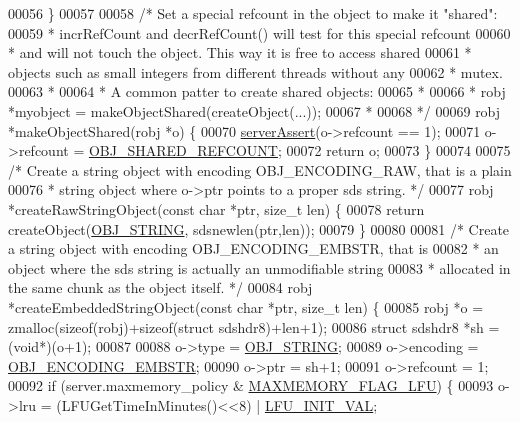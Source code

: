 \begin{DoxyCode}
00056 \}
00057 
00058 \textcolor{comment}{/* Set a special refcount in the object to make it "shared":}
00059 \textcolor{comment}{ * incrRefCount and decrRefCount() will test for this special refcount}
00060 \textcolor{comment}{ * and will not touch the object. This way it is free to access shared}
00061 \textcolor{comment}{ * objects such as small integers from different threads without any}
00062 \textcolor{comment}{ * mutex.}
00063 \textcolor{comment}{ *}
00064 \textcolor{comment}{ * A common patter to create shared objects:}
00065 \textcolor{comment}{ *}
00066 \textcolor{comment}{ * robj *myobject = makeObjectShared(createObject(...));}
00067 \textcolor{comment}{ *}
00068 \textcolor{comment}{ */}
00069 robj *makeObjectShared(robj *o) \{
00070     \hyperlink{server_8h_a88114b5169b4c382df6b56506285e56a}{serverAssert}(o->refcount == 1);
00071     o->refcount = \hyperlink{server_8h_a1dc2a137875b0c8ee0fa1df43684a7b8}{OBJ\_SHARED\_REFCOUNT};
00072     \textcolor{keywordflow}{return} o;
00073 \}
00074 
00075 \textcolor{comment}{/* Create a string object with encoding OBJ\_ENCODING\_RAW, that is a plain}
00076 \textcolor{comment}{ * string object where o->ptr points to a proper sds string. */}
00077 robj *createRawStringObject(\textcolor{keyword}{const} \textcolor{keywordtype}{char} *ptr, size\_t len) \{
00078     \textcolor{keywordflow}{return} createObject(\hyperlink{server_8h_a65236ea160f69cdef33ec942092af88f}{OBJ\_STRING}, sdsnewlen(ptr,len));
00079 \}
00080 
00081 \textcolor{comment}{/* Create a string object with encoding OBJ\_ENCODING\_EMBSTR, that is}
00082 \textcolor{comment}{ * an object where the sds string is actually an unmodifiable string}
00083 \textcolor{comment}{ * allocated in the same chunk as the object itself. */}
00084 robj *createEmbeddedStringObject(\textcolor{keyword}{const} \textcolor{keywordtype}{char} *ptr, size\_t len) \{
00085     robj *o = zmalloc(\textcolor{keyword}{sizeof}(robj)+\textcolor{keyword}{sizeof}(\textcolor{keyword}{struct} sdshdr8)+len+1);
00086     \textcolor{keyword}{struct} sdshdr8 *sh = (\textcolor{keywordtype}{void}*)(o+1);
00087 
00088     o->type = \hyperlink{server_8h_a65236ea160f69cdef33ec942092af88f}{OBJ\_STRING};
00089     o->encoding = \hyperlink{server_8h_ac5bb76b546161fd0da4b0ff89b3142ee}{OBJ\_ENCODING\_EMBSTR};
00090     o->ptr = sh+1;
00091     o->refcount = 1;
00092     \textcolor{keywordflow}{if} (server.maxmemory\_policy & \hyperlink{server_8h_aac2d3ad7a604f87e06e25233dbd01c9b}{MAXMEMORY\_FLAG\_LFU}) \{
00093         o->lru = (LFUGetTimeInMinutes()<<8) | \hyperlink{server_8h_a8cec44bf7da67aac58839ab5033bdc0a}{LFU\_INIT\_VAL};

\end{DoxyCode}
